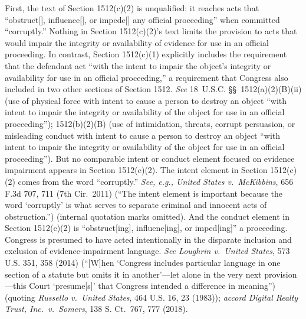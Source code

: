 First, the text of Section 1512(c)(2) is unqualified: it reaches acts that ``obstruct[], influence[], or impede[] any official proceeding'' when committed ``corruptly.''
Nothing in Section 1512(c)(2)'s text limits the provision to acts that would impair the integrity or availability of evidence for use in an official proceeding.
In contrast, Section 1512(c)(1) explicitly includes the requirement that the defendant act ``with the intent to impair the object's integrity or availability for use in an official proceeding,'' a requirement that Congress also included in two other sections of Section 1512.
\textit{See} 18~U.S.C. \S\S~1512(a)(2)(B)(ii) (use of physical force with intent to cause a person to destroy an object ``with intent to impair the integrity or availability of the object for use in an official proceeding'');
1512(b)(2)(B) (use of intimidation, threats, corrupt persuasion, or misleading conduct with intent to cause a person to destroy an object ``with intent to impair the integrity or availability of the object for use in an official proceeding'').
But no comparable intent or conduct element focused on evidence impairment appears in Section 1512(c)(2).
The intent element in Section 1512(c)(2) comes from the word ``corruptly.''
\textit{See, e.g., United States v.\ McKibbins}, 656 F.3d 707, 711 (7th Cir.~2011) (``The intent element is important because the word `corruptly' is what serves to separate criminal and innocent acts of obstruction.'') (internal quotation marks omitted).
And the conduct element in Section 1512(c)(2) is ``obstruct[ing], influenc[ing], or imped[ing]'' a proceeding.
Congress is presumed to have acted intentionally in the disparate inclusion and exclusion of evidence-impairment language.
\textit{See Loughrin v.\ United States}, 573 U.S. 351, 358 (2014) (``[W]hen `Congress includes particular language in one section of a statute but omits it in another'---let alone in the very next provision---this Court `presume[s]' that Congress intended a difference in meaning'') (quoting \textit{Russello v.\ United States}, 464 U.S. 16, 23 (1983));
\textit{accord Digital Realty Trust, Inc.\ v.\ Somers}, 138 S. Ct.~767, 777 (2018).

